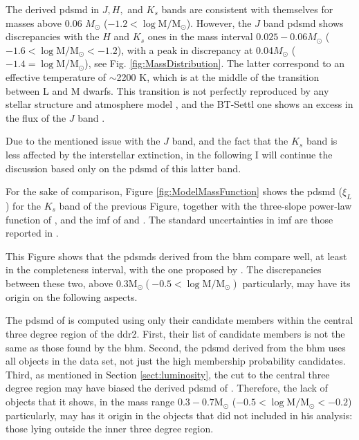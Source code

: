 The derived \gls{pdsmd} in $J,H,$ and $K_s$ bands are consistent with themselves for masses above 0.06 $M_{\odot}$ ($-1.2 < \log \mathrm{M/M_{\odot}}$). However, the $J$ band \gls{pdsmd} shows discrepancies with the $H$ and $K_s$ ones in the mass interval  $0.025 - 0.06 M_{\odot}$ ($-1.6 < \log \mathrm{M/M_{\odot}} < -1.2$), with a peak in discrepancy at 0.04$M_{\odot}$ ($-1.4 = \log \mathrm{M/M_{\odot}}$), see Fig. \ref{fig:MassDistribution}. The latter correspond to an effective temperature of $\sim$2200 K, which is at the middle of the transition between L and M dwarfs. This transition is not perfectly reproduced by any stellar structure and atmosphere model \citep{Allard2012}, and the BT-Settl one shows an excess in the flux of the $J$ band \citep{2013MmSAI..84.1053A}.

Due to the mentioned issue with the $J$ band, and the fact that the $K_s$ band is less affected by the interstellar extinction, in the following I will continue the discussion based only on the \gls{pdsmd} of this latter band.

For the sake of comparison, Figure \ref{fig:ModelMassFunction} shows the \gls{pdsmd} ($\xi_L$) for the $K_s$ band of the previous Figure, together with the three-slope power-law function of \citet{Bouy2015}, and the \gls{imf} of \citet{Thies2007} and \citet{Chabrier2005}. The standard uncertainties in \citet{Chabrier2005} \gls{imf} are those reported in \citet{Chabrier2003b}. 

This Figure shows that the \glspl{pdsmd} derived from the \gls{bhm} compare well, at least in the completeness interval, with the one proposed by \citet{Bouy2015}. The discrepancies between these two, above $0.3 \mathrm{M_{\odot}} (-0.5 < \log \mathrm{M/M_{\odot}})$ particularly, may have its origin on the following aspects.

The \gls{pdsmd} of \citet{Bouy2015} is computed using only their candidate members within the central three degree region of the \gls{ddr2}. First, their list of candidate members is not the same as those found by the \gls{bhm}. Second, the \gls{pdsmd} derived from the \gls{bhm} uses all objects in the data set, not just the high membership probability candidates. Third, as mentioned in Section \ref{sect:luminosity}, the cut to the central three degree region may have biased the derived \gls{pdsmd} of \citet{Bouy2015}. Therefore, the lack of objects that it shows,  in the mass range $0.3 - 0.7 \mathrm{M_{\odot}}$ ($-0.5 < \log \mathrm{M/M_{\odot}} < -0.2$) particularly, may has it origin in the objects that \citet{Bouy2015} did not included in his analysis: those lying outside the inner three degree region. 

